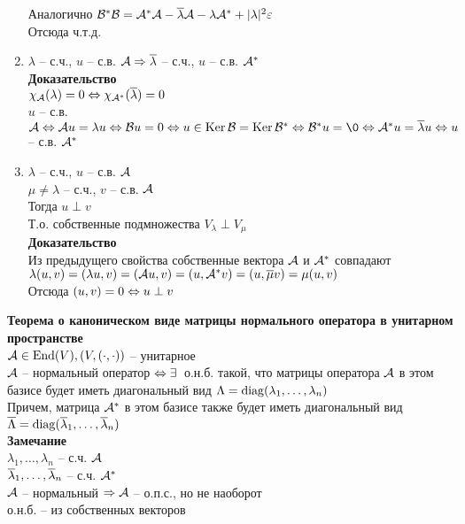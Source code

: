 \documentclass[12pt]{article}
\begin{document}
\begin{enumerate}
        Аналогично $\mathcal{B}^*\mathcal{B} = \mathcal{A}^*\mathcal{A} - \overline \lambda\mathcal{A} - \lambda\mathcal{A}^*  + | \lambda|^2\varepsilon $\\
        Отсюда ч.т.д.
    \item $ \lambda $ -- с.ч., $u$ -- с.в. $\mathcal{A} \Rightarrow \overline \lambda$ -- с.ч., $u$ -- с.в. $\mathcal{A}^*$\\
        \textbf{Доказательство}\\
        $\chi_\mathcal{A}( \lambda) = 0 \Leftrightarrow \chi_{\mathcal{A}^*}(\overline \lambda) = 0 $\\
        $u$ -- с.в. $\mcA \LRto \mcA u = \lambda u \LRto \mcB u = 0 \LRto u \in \ker \mcB = \ker \mcB^* \LRto \mcB^*u = \0 \LRto \mcA^* u = \ol \lambda u \LRto u$ -- с.в. $\mathcal{A}^*$
    \item $ \lambda$ -- с.ч., $u$ -- с.в. $\mathcal{A}$\\
        $ \mu \neq \lambda$ -- с.ч., $v$ -- с.в. $\mathcal{A}$\\
        Тогда $u \perp v$\\
        Т.о. собственные подмножества $V_ \lambda \perp V_ \mu$\\
        \textbf{Доказательство}\\
        Из предыдущего свойства собственные вектора $\mathcal{A}$ и $\mathcal{A}^*$ совпадают\\
        $ \lambda(u, v) = ( \lambda u, v) = (\mathcal{A} u, v) = (u, \mathcal{A}^* v) = (u, \overline \mu v) = \mu(u, v)$\\
        Отсюда $(u, v) = 0 \Leftrightarrow u \perp v$
\end{enumerate}
\textbf{Теорема о каноническом виде матрицы нормального оператора в унитарном пространстве}\\
$\mathcal{A} \in \operatorname{End}(V), (V, (\cdot, \cdot))$ -- унитарное\\
$\mathcal{A}$ -- нормальный оператор $\Leftrightarrow \exists\,$ о.н.б. такой, что матрицы оператора $\mathcal{A}$ в этом базисе будет иметь диагональный вид $ \Lambda = \operatorname{diag}( \lambda_1, \ldots, \lambda_n)$\\
Причем, матрица $\mathcal{A}^*$ в этом базисе также будет иметь диагональный вид $\overline{ \Lambda} = \operatorname{diag}(\overline \lambda_1, \ldots, \overline \lambda_n)$\\
\textbf{Замечание}\\
$ \lambda_1, \ldots, \lambda_n$ -- с.ч. $\mathcal{A}$\\
$\overline \lambda_1, \ldots, \overline \lambda_n$ -- с.ч. $\mathcal{A}^*$\\
$\mathcal{A}$ -- нормальный $\Rightarrow \mathcal{A}$ -- о.п.с., но не наоборот\\
о.н.б. -- из собственных векторов\\
\end{document}
